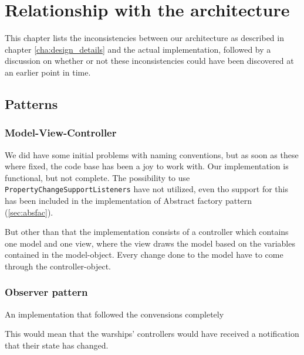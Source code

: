 \chapter{Relationship with the architecture}
\label{cha:relationship_with_the_architecture}

This chapter lists the inconsistencies between our architecture as described in chapter \ref{cha:design_details} and the actual implementation, followed by a discussion on whether or not these inconsistencies could have been discovered at an earlier point in time.



\section{Patterns}

\subsection{Model-View-Controller}
\label{sec:mvc}

We did have some initial problems with naming conventions, but as soon as these where fixed, the code base has been a joy to work with.
Our implementation is functional, but not complete. The possibility to use \texttt{PropertyChangeSupportListeners} have not utilized, even tho support for this has been included in the implementation of Abstract factory pattern (\ref{sec:absfac}).

But other than that the implementation consists of a controller which contains one model and one view, where the view draws the model based on the variables contained in the model-object. Every change done to the model have to come through the controller-object.


\subsection{Observer pattern}

An implementation that followed the convensions completely

This would mean that the warships' controllers would have received a notification that their state has changed.

